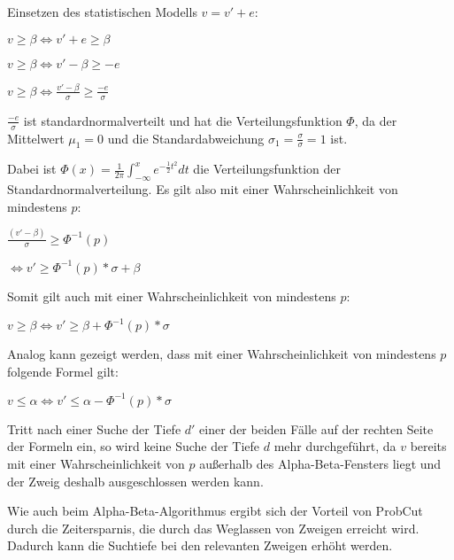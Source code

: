 Einsetzen des statistischen Modells $v=v'+e$:

\hspace*{1.3cm}
$v\geq\beta\iff v'+e\geq\beta$

\hspace*{1.3cm}
$v\geq\beta\iff v'-\beta\geq -e$

\hspace*{1.3cm}
$v\geq\beta\iff \frac{v'-\beta}{\sigma}\geq \frac{-e}{\sigma}$

$\frac{-e}{\sigma}$ ist standardnormalverteilt und hat die Verteilungsfunktion $\Phi$, da der Mittelwert $\mu_1=0$ und
die Standardabweichung $\sigma_1=\frac{\sigma}{\sigma}=1$ ist.

Dabei ist $\Phi(x)=\frac{1}{2\pi}\int_{-\infty}^xe^{-\frac{1}{2}t^2}dt$ die Verteilungsfunktion der
Standardnormalverteilung. Es gilt also mit einer Wahrscheinlichkeit von mindestens $p$:

\hspace*{1.3cm}
$\frac{(v'-\beta)}{\sigma}\geq\Phi^{-1}(p)$

\hspace*{1.3cm}
$\iff v'\geq\Phi^{-1}(p)*\sigma+\beta$

Somit gilt auch mit einer Wahrscheinlichkeit von mindestens $p$:

\hspace*{1.3cm}
\(v\geq\beta \iff v'\geq\beta+\Phi^{-1}(p)*\sigma\)

Analog kann gezeigt werden, dass mit einer Wahrscheinlichkeit von mindestens $p$ folgende Formel gilt:

\hspace*{1.3cm}
\(v\leq\alpha \iff v'\leq\alpha-\Phi^{-1}(p)*\sigma\)


Tritt nach einer Suche der Tiefe \(d'\) einer der beiden Fälle auf der rechten Seite der Formeln ein, so wird keine Suche der Tiefe
\(d\) mehr durchgeführt, da \(v\) bereits mit einer Wahrscheinlichkeit von \(p\) außerhalb des Alpha-Beta-Fensters liegt
und der Zweig deshalb ausgeschlossen werden kann.

Wie auch beim Alpha-Beta-Algorithmus ergibt sich der Vorteil von ProbCut durch die Zeitersparnis, die durch das
Weglassen von Zweigen erreicht wird. Dadurch kann die Suchtiefe bei den relevanten Zweigen erhöht werden.
\cite[S.~1]{probcut}
